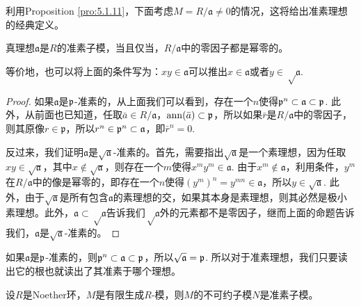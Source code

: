 

利用Proposition \ref{pro:5.1.11}，下面考虑$M=R/\mathfrak{a}\neq 0$的情况，这将给出准素理想的经典定义。

\begin{pro}
真理想$\mathfrak{a}$是$R$的准素子模，当且仅当，$R/\mathfrak{a}$中的零因子都是幂零的。
\end{pro}

等价地，也可以将上面的条件写为：$xy\in \mathfrak{a}$可以推出$x\in \mathfrak{a}$或者$y\in \sqrt\mathfrak{a}$.

\begin{proof}
如果$\mathfrak{a}$是$\mathfrak{p}$-准素的，从上面我们可以看到，存在一个$n$使得$\mathfrak{p}^n\subset \mathfrak{a}\subset \mathfrak{p}$. 此外，从前面也已知道，任取$\bar{a}\in R/\mathfrak{a}$，$\operatorname{ann}(\bar{a})\subset \mathfrak{p}$，所以如果$\bar r$是$R/\mathfrak{a}$中的零因子，则其原像$r\in \mathfrak{p}$，所以$r^n\in \mathfrak{p}^n\subset \mathfrak{a}$，即$\bar r^n=0$. 

反过来，我们证明$\mathfrak{a}$是$\sqrt{\mathfrak{a}}$-准素的。首先，需要指出$\sqrt{\mathfrak{a}}$是一个素理想，因为任取$xy\in \sqrt{\mathfrak{a}}$，其中$x\not\in \sqrt{\mathfrak{a}}$，则存在一个$m$使得$x^m y^m\in \mathfrak{a}$. 由于$x^m\not\in \mathfrak{a}$，利用条件，$y^m$在$R/\mathfrak{a}$中的像是幂零的，即存在一个$n$使得$(y^m)^n=y^{mn}\in \mathfrak{a}$，所以$y\in\sqrt{\mathfrak{a}}$. 此外，由于$\sqrt{\mathfrak{a}}$是所有包含$\mathfrak{a}$的素理想的交，如果其本身是素理想，则其必然是极小素理想。此外，$\mathfrak{a}\subset \sqrt\mathfrak{a}$告诉我们$\sqrt\mathfrak{a}$外的元素都不是零因子，继而上面的命题告诉我们，$\mathfrak{a}$是$\sqrt{\mathfrak{a}}$-准素的。
\end{proof}

如果$\mathfrak{a}$是$\mathfrak{p}$-准素的，则$\mathfrak{p}^n\subset \mathfrak{a}\subset \mathfrak{p}$，所以$\sqrt{\mathfrak{a}}=\mathfrak{p}$. 所以对于准素理想，我们只要读出它的根也就读出了其准素于哪个理想。

\begin{lem}
设$R$是Noether环，$M$是有限生成$R$-模，则$M$的不可约子模$N$是准素子模。
\end{lem}


